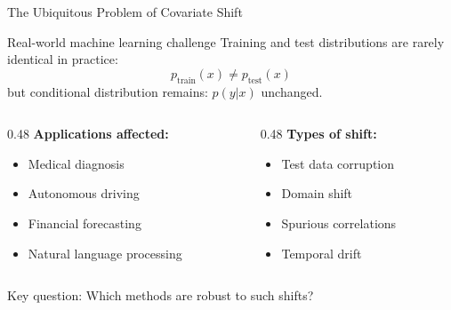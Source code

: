 \documentclass[unicode]{beamer}
\numberwithin{equation}{section}
\begin{document}
\begin{frame}{The Ubiquitous Problem of Covariate Shift}
    \begin{block}{Real-world machine learning challenge}
        Training and test distributions are rarely identical in practice:
        \[
        p_{\text{train}}(x) \neq p_{\text{test}}(x)
        \]
        but conditional distribution remains: \( p(y|x) \) unchanged.
    \end{block}
    
    \begin{columns}[T]
        \begin{column}{0.48\textwidth}
            \textbf{Applications affected:}
            \begin{itemize}
                \item Medical diagnosis
                \item Autonomous driving
                \item Financial forecasting
                \item Natural language processing
            \end{itemize}
        \end{column}
        \begin{column}{0.48\textwidth}
            \textbf{Types of shift:}
            \begin{itemize}
                \item Test data corruption
                \item Domain shift
                \item Spurious correlations
                \item Temporal drift
            \end{itemize}
        \end{column}
    \end{columns}
    
    \vspace{0.5cm}
    \alert{Key question:} Which methods are robust to such shifts?
\end{frame}
\end{document}
